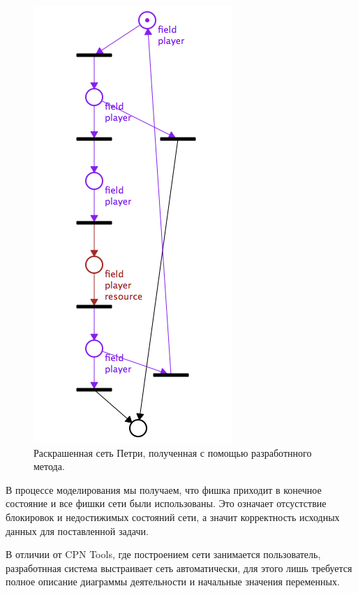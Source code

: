 \begin{figure}
	\begin{center}
		\includegraphics[scale=1]{include/PetriNet.png}
	\end{center}
	\caption{Раскрашенная сеть Петри, полученная с помощью разработнного метода.}
	\label{fig:fig29}
\end{figure}

В процессе моделирования мы получаем, что фишка приходит в конечное состояние и все фишки сети были использованы. Это означает отсустствие блокировок и недостижимых состояний сети, а значит корректность исходных данных для поставленной задачи.

В отличии от CPN Tools, где построением сети занимается пользователь, разработнная система выстраивает сеть автоматически, для этого лишь требуется полное описание диаграммы деятельности и начальные значения переменных.

\label{cha:implementation}

